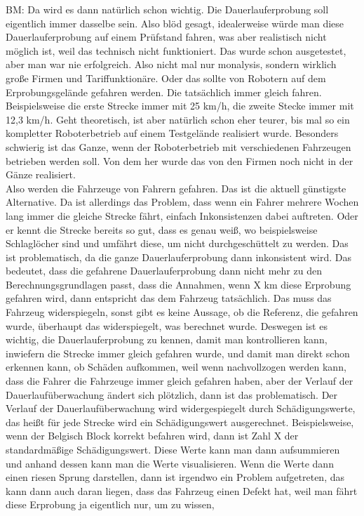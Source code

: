 \begin{linenumbers}
BM: Da wird es dann natürlich schon wichtig. Die Dauerlauferprobung soll eigentlich immer dasselbe sein. Also blöd gesagt, idealerweise würde man diese Dauerlauferprobung auf einem Prüfstand fahren, was aber realistisch nicht möglich ist, weil das technisch nicht funktioniert. Das wurde schon ausgetestet, aber man war nie erfolgreich. Also nicht mal nur monalysis, sondern wirklich große Firmen und Tariffunktionäre. Oder das sollte von Robotern auf dem Erprobungsgelände gefahren werden. Die tatsächlich immer gleich fahren. Beispielsweise die erste Strecke immer mit 25 km/h, die zweite Stecke immer mit 12,3 km/h. Geht theoretisch, ist aber natürlich schon eher teurer, bis mal so ein kompletter Roboterbetrieb auf einem Testgelände realisiert wurde. Besonders schwierig ist das Ganze, wenn der Roboterbetrieb mit verschiedenen Fahrzeugen betrieben werden soll. Von dem her wurde das von den Firmen noch nicht in der Gänze realisiert.\\ Also werden die Fahrzeuge von Fahrern gefahren. Das ist die aktuell günstigste Alternative. Da ist allerdings das Problem, dass wenn ein Fahrer mehrere Wochen lang immer die gleiche Strecke fährt, einfach Inkonsistenzen dabei auftreten. Oder er kennt die Strecke bereits so gut, dass es genau weiß, wo beispielsweise Schlaglöcher sind und umfährt diese, um nicht durchgeschüttelt zu werden. Das ist problematisch, da die ganze Dauerlauferprobung dann inkonsistent wird. Das bedeutet, dass die gefahrene Dauerlauferprobung dann nicht mehr zu den Berechnungsgrundlagen passt, dass die Annahmen, wenn X km diese Erprobung gefahren wird, dann entspricht das dem Fahrzeug tatsächlich. Das muss das Fahrzeug widerspiegeln, sonst gibt es keine Aussage, ob die Referenz, die gefahren wurde, überhaupt das widerspiegelt, was berechnet wurde. Deswegen ist es wichtig, die Dauerlauferprobung zu kennen, damit man kontrollieren kann, inwiefern die Strecke immer gleich gefahren wurde, und damit man direkt schon erkennen kann, ob Schäden aufkommen, weil wenn nachvollzogen werden kann, dass die Fahrer die Fahrzeuge immer gleich gefahren haben, aber der Verlauf der Dauerlaufüberwachung ändert sich plötzlich, dann ist das problematisch. Der Verlauf der Dauerlaufüberwachung wird widergespiegelt durch Schädigungswerte, das heißt für jede Strecke wird ein Schädigungswert ausgerechnet. Beispielsweise, wenn der Belgisch Block korrekt befahren wird, dann ist Zahl X der standardmäßige Schädigungswert. Diese Werte kann man dann aufsummieren und anhand dessen kann man die Werte visualisieren. Wenn die Werte dann einen riesen Sprung darstellen, dann ist irgendwo ein Problem aufgetreten, das kann dann auch daran liegen, dass das Fahrzeug einen Defekt hat, weil man fährt diese Erprobung ja eigentlich nur, um zu wissen, 
\end{linenumbers}

